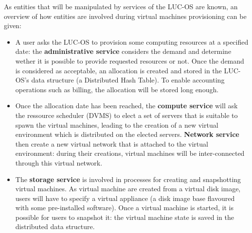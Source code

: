 As entities that will be manipulated by services of the LUC-OS are known, an
overview of how entities are involved during virtual machines provisioning can
be given:

\begin{itemize}

	\item A user asks the LUC-OS to provision some computing resources at a 
	specified date:  the \textbf{administrative service} considers the demand 
	and determine  wether it is possible to provide requested resources or not. 
	Once the demand is considered as acceptable, an allocation is created and 
	stored in the  LUC-OS's data structure (a Distributed Hash Table). To enable
	accounting operations such as billing, the allocation will be stored long
	enough.

	\item Once the allocation date has been reached, the \textbf{compute
	service} will ask the ressource scheduler (DVMS) to elect a 
	set of servers that is suitable to spawn the virtual machines, leading to 
	the creation of a new virtual environment which is distributed on the 
	elected servers. \textbf{Network service} then create a new virtual	network
	that is attached to the virtual	environment: during their creations, virtual
	machines will be inter-connected through this virtual network.

	\item The \textbf{storage service} is involved in processes for creating and 
	snapshotting virtual machines. As virtual machine are created from a virtual
	disk image, users will have to specify a virtual appliance (a disk image 
	base flavoured with some pre-installed software). Once a virtual machine is 
	started, it is possible for users to snapshot it: the virtual machine state
	is saved in the distributed data structure.

\end{itemize}







